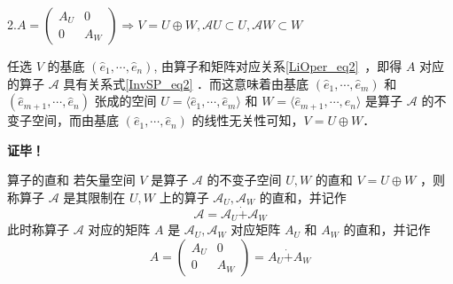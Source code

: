 2.$
A=\begin{pmatrix}
A_U&0\\
0&A_W
\end{pmatrix}\Rightarrow V=U\oplus W,\mathcal{A}U\subset U,\mathcal{A}W\subset W
$

任选 $V$ 的基底 $(\hat e_1,\cdots,\hat e_n)$, 由算子和矩阵对应关系\autoref{LiOper_eq2}~，即得 $A$ 对应的算子 $\mathcal{A}$ 具有关系式\autoref{InvSP_eq2} ．而这意味着由基底 $(\hat e_1,\cdots,\hat e_m)$ 和 $(\hat e_{m+1},\cdots,\hat e_n)$ 张成的空间 $U=\langle\hat e_1,\cdots,\hat e_m\rangle$ 和 $W=\langle\hat e_{m+1},\cdots,\hat e_n\rangle$ 是算子 $\mathcal{A}$ 的不变子空间，而由基底 $(\hat e_1,\cdots,\hat e_n)$ 的线性无关性可知，$V=U\oplus W$．

\textbf{证毕！}


\begin{definition}{算子的直和}
若矢量空间 $V$ 是算子 $\mathcal{A}$ 的不变子空间 $U,W$ 的直和 $V=U\oplus W$ ，则称算子 $\mathcal{A}$ 是其限制在 $U,W$ 上的算子 $\mathcal{A}_U,\mathcal{A}_W$ 的直和，并记作
\begin{equation}
\mathcal{A}=\mathcal{A}_U\dot{+}\mathcal{A}_W
\end{equation}
此时称算子 $\mathcal{A}$ 对应的矩阵 $A$ 是 $\mathcal{A}_U,\mathcal{A}_W$ 对应矩阵 $A_U$ 和 $A_W$ 的直和，并记作
\begin{equation}
A=\begin{pmatrix}
A_U&0\\
0&A_W
\end{pmatrix}=A_U\dot{+}A_W
\end{equation}

\end{definition}